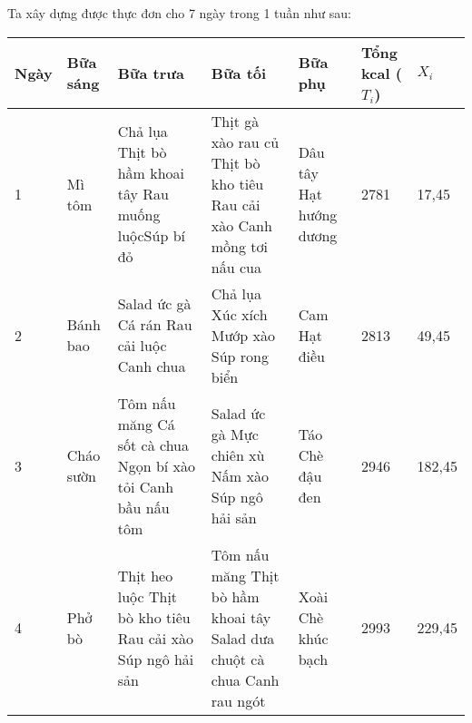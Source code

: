 Ta xây dựng được thực đơn cho 7 ngày trong 1 tuần như sau:
\begin{center}
\begin{tabular}{ | m{0.8cm} | m{2cm}| m{3cm} |m{3cm} | m{3.2cm} | m{2.2cm} |m{1cm} |}
 \hline
  Ngày & Bữa sáng & Bữa trưa & Bữa tối & Bữa phụ & Tổng kcal ($T_i$) & $X_i$\\ 
\hline
  1 & Mì tôm & Chả lụa \newline Thịt bò hầm khoai tây \newline Rau muống luộc\newline Súp bí đỏ& Thịt gà xào rau củ \newline Thịt bò kho tiêu \newline Rau cải xào \newline Canh mồng tơi nấu cua & Dâu tây \newline Hạt hướng dương & 2781 & 17,45 \\ 
 \hline
  2 & Bánh bao & Salad ức gà \newline Cá rán \newline Rau cải luộc \newline Canh chua & Chả lụa \newline Xúc xích \newline Mướp xào \newline Súp rong biển & Cam \newline Hạt điều & 2813 & 49,45 \\ 
 \hline
  3 & Cháo sườn & Tôm nấu măng \newline Cá sốt cà chua \newline Ngọn bí xào tỏi \newline Canh bầu nấu tôm & Salad ức gà \newline Mực chiên xù \newline Nấm xào \newline Súp ngô hải sản & Táo \newline Chè đậu đen & 2946 & 182,45 \\ 
 \hline
  4 & Phở bò  & Thịt heo luộc \newline Thịt bò kho tiêu \newline Rau cải xào \newline Súp ngô hải sản & Tôm nấu măng \newline Thịt bò hầm khoai tây \newline Salad dưa chuột cà chua \newline Canh rau ngót  & Xoài \newline Chè khúc bạch & 2993 & 229,45 \\ 

\end{tabular}
\end{center}
